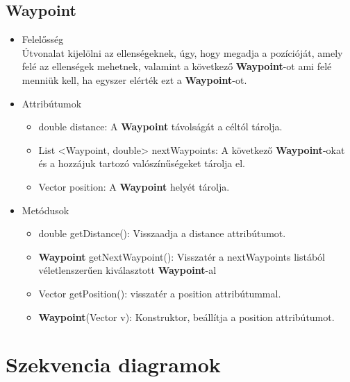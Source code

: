 \subsection{Waypoint}
\begin{itemize}
\item Felelősség\\
Útvonalat kijelölni az ellenségeknek, úgy, hogy megadja a pozícióját, amely felé az ellenségek mehetnek, valamint a következő  \textbf{Waypoint}-ot ami felé menniük kell, ha egyszer elérték ezt a  \textbf{Waypoint}-ot.
\item Attribútumok
	\begin{itemize}
		\item double distance: A  \textbf{Waypoint} távolságát a céltól tárolja.
		\item List <Waypoint, double> nextWaypoints: A következő  \textbf{Waypoint}-okat és a hozzájuk tartozó valószínűségeket tárolja el.
		\item Vector position: A  \textbf{Waypoint} helyét tárolja.
	\end{itemize}
\item Metódusok
	\begin{itemize}
		\item double getDistance(): Visszaadja a distance attribútumot.
		\item \textbf{Waypoint} getNextWaypoint(): Visszatér a nextWaypoints listából véletlenszerűen kiválasztott \textbf{Waypoint}-al
		\item Vector getPosition(): visszatér a position attribútummal.
		\item \textbf{Waypoint}(Vector v): Konstruktor, beállítja a position attribútumot. 
	\end{itemize}
\end{itemize}



\section{Szekvencia diagramok}

